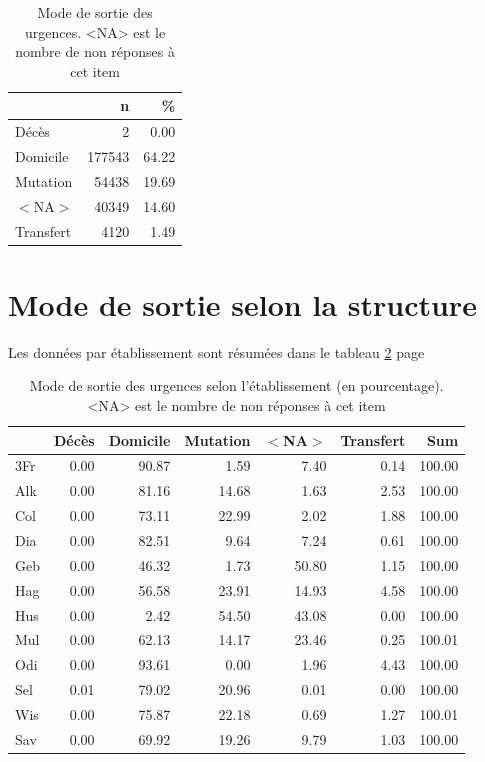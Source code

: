 \documentclass[12pt,english,french,twoside]{report}\usepackage[]{graphicx}\usepackage[]{color}
\begin{document}
\begin{table}[ht]
\centering
\begin{tabular}{|l|r|r|}
  \hline
 & n & \% \\ 
  \hline
Décès & 2 & 0.00 \\ 
  Domicile & 177543 & 64.22 \\ 
  Mutation & 54438 & 19.69 \\ 
  $<$NA$>$ & 40349 & 14.60 \\ 
  Transfert & 4120 & 1.49 \\ 
   \hline
\end{tabular}
\caption[Mode de sortie des urgences]{Mode de sortie des urgences. <NA> est le nombre de non réponses à cet item} 
\label{tab.sortie}
\end{table}



\section{Mode de sortie selon la structure}

Les données par établissement sont résumées dans le tableau \ref{tab.sortie_etab} page \pageref{tab.sortie_etab}

\begin{table}[ht]
\centering
\begin{tabular}{|l|r|r|r|r|r|r|}
  \hline
 & Décès & Domicile & Mutation & $<$NA$>$ & Transfert & Sum \\ 
  \hline
3Fr & 0.00 & 90.87 & 1.59 & 7.40 & 0.14 & 100.00 \\ 
  Alk & 0.00 & 81.16 & 14.68 & 1.63 & 2.53 & 100.00 \\ 
  Col & 0.00 & 73.11 & 22.99 & 2.02 & 1.88 & 100.00 \\ 
  Dia & 0.00 & 82.51 & 9.64 & 7.24 & 0.61 & 100.00 \\ 
  Geb & 0.00 & 46.32 & 1.73 & 50.80 & 1.15 & 100.00 \\ 
  Hag & 0.00 & 56.58 & 23.91 & 14.93 & 4.58 & 100.00 \\ 
  Hus & 0.00 & 2.42 & 54.50 & 43.08 & 0.00 & 100.00 \\ 
  Mul & 0.00 & 62.13 & 14.17 & 23.46 & 0.25 & 100.01 \\ 
  Odi & 0.00 & 93.61 & 0.00 & 1.96 & 4.43 & 100.00 \\ 
  Sel & 0.01 & 79.02 & 20.96 & 0.01 & 0.00 & 100.00 \\ 
  Wis & 0.00 & 75.87 & 22.18 & 0.69 & 1.27 & 100.01 \\ 
  Sav & 0.00 & 69.92 & 19.26 & 9.79 & 1.03 & 100.00 \\ 
   \hline
\end{tabular}
\caption[Mode de sortie selon l'établissement]{Mode de sortie des urgences selon l'établissement (en pourcentage). <NA> est le nombre de non réponses à cet item} 
\label{tab.sortie_etab}
\end{table}
\end{document}
